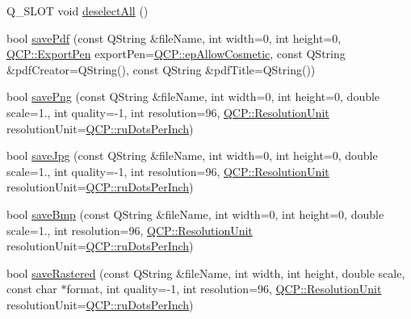 \begin{DoxyCompactItemize}
Q\+\_\+\+S\+L\+OT void \mbox{\hyperlink{class_q_custom_plot_a9d4808ab925b003054085246c92a257c}{deselect\+All}} ()
\item 
bool \mbox{\hyperlink{class_q_custom_plot_ad5acd34f6b39c3516887d7e54fec2412}{save\+Pdf}} (const Q\+String \&file\+Name, int width=0, int height=0, \mbox{\hyperlink{namespace_q_c_p_a17844f19e1019693a953e1eb93536d2f}{Q\+C\+P\+::\+Export\+Pen}} export\+Pen=\mbox{\hyperlink{namespace_q_c_p_a17844f19e1019693a953e1eb93536d2fa50d3657dba3fb90560b93a823cb0a6e8}{Q\+C\+P\+::ep\+Allow\+Cosmetic}}, const Q\+String \&pdf\+Creator=Q\+String(), const Q\+String \&pdf\+Title=Q\+String())
\item 
bool \mbox{\hyperlink{class_q_custom_plot_ac92cc9256d12f354b40a4be4600b5fb9}{save\+Png}} (const Q\+String \&file\+Name, int width=0, int height=0, double scale=1., int quality=-\/1, int resolution=96, \mbox{\hyperlink{namespace_q_c_p_a715d46153da230990aa887d0f0602452}{Q\+C\+P\+::\+Resolution\+Unit}} resolution\+Unit=\mbox{\hyperlink{namespace_q_c_p_a715d46153da230990aa887d0f0602452affb887d8efe79c39a1aca2acd7002afc}{Q\+C\+P\+::ru\+Dots\+Per\+Inch}})
\item 
bool \mbox{\hyperlink{class_q_custom_plot_a76f0d278e630a711fa6f48048cfd83e4}{save\+Jpg}} (const Q\+String \&file\+Name, int width=0, int height=0, double scale=1., int quality=-\/1, int resolution=96, \mbox{\hyperlink{namespace_q_c_p_a715d46153da230990aa887d0f0602452}{Q\+C\+P\+::\+Resolution\+Unit}} resolution\+Unit=\mbox{\hyperlink{namespace_q_c_p_a715d46153da230990aa887d0f0602452affb887d8efe79c39a1aca2acd7002afc}{Q\+C\+P\+::ru\+Dots\+Per\+Inch}})
\item 
bool \mbox{\hyperlink{class_q_custom_plot_ae3a86ed0795670e50afa21759d4fa13d}{save\+Bmp}} (const Q\+String \&file\+Name, int width=0, int height=0, double scale=1., int resolution=96, \mbox{\hyperlink{namespace_q_c_p_a715d46153da230990aa887d0f0602452}{Q\+C\+P\+::\+Resolution\+Unit}} resolution\+Unit=\mbox{\hyperlink{namespace_q_c_p_a715d46153da230990aa887d0f0602452affb887d8efe79c39a1aca2acd7002afc}{Q\+C\+P\+::ru\+Dots\+Per\+Inch}})
\item 
bool \mbox{\hyperlink{class_q_custom_plot_ad7723ce2edfa270632ef42b03a444352}{save\+Rastered}} (const Q\+String \&file\+Name, int width, int height, double scale, const char $\ast$format, int quality=-\/1, int resolution=96, \mbox{\hyperlink{namespace_q_c_p_a715d46153da230990aa887d0f0602452}{Q\+C\+P\+::\+Resolution\+Unit}} resolution\+Unit=\mbox{\hyperlink{namespace_q_c_p_a715d46153da230990aa887d0f0602452affb887d8efe79c39a1aca2acd7002afc}{Q\+C\+P\+::ru\+Dots\+Per\+Inch}})

\end{DoxyCompactItemize}
